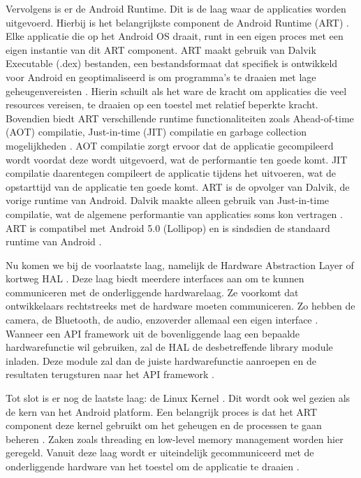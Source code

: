 Vervolgens is er de Android Runtime. Dit is de laag waar de applicaties worden uitgevoerd. Hierbij is het belangrijkste component de Android Runtime (ART) \autocite{Bron7}. Elke applicatie die op het Android OS draait, runt in een eigen proces met een eigen instantie van dit ART component. ART maakt gebruik van Dalvik Executable (.dex) bestanden, een bestandsformaat dat specifiek is ontwikkeld voor Android en geoptimaliseerd is om programma's te draaien met lage geheugenvereisten \autocite{Bron14}. Hierin schuilt als het ware de kracht om applicaties die veel resources vereisen, te draaien op een toestel met relatief beperkte kracht. Bovendien biedt ART verschillende runtime functionaliteiten zoals Ahead-of-time (AOT) compilatie, Just-in-time (JIT) compilatie en garbage collection mogelijkheden \autocite{Bron7, Bron14}. AOT compilatie zorgt ervoor dat de applicatie gecompileerd wordt voordat deze wordt uitgevoerd, wat de performantie ten goede komt. JIT compilatie daarentegen compileert de applicatie tijdens het uitvoeren, wat de opstarttijd van de applicatie ten goede komt. ART is de opvolger van Dalvik, de vorige runtime van Android. Dalvik maakte alleen gebruik van Just-in-time compilatie, wat de algemene performantie van applicaties soms kon vertragen \autocite{Bron13}. ART is compatibel met Android 5.0 (Lollipop) en is sindsdien de standaard runtime van Android \autocite{Bron7, Bron13}.

Nu komen we bij de voorlaatste laag, namelijk de Hardware Abstraction Layer of kortweg HAL \autocite{Bron7}. Deze laag biedt meerdere interfaces aan om te kunnen communiceren met de onderliggende hardwarelaag. Ze voorkomt dat ontwikkelaars rechtstreeks met de hardware moeten communiceren. Zo hebben de camera, de Bluetooth, de audio, enzoverder allemaal een eigen interface \autocite{Bron7}. Wanneer een API framework uit de bovenliggende laag een bepaalde hardwarefunctie wil gebruiken, zal de HAL de desbetreffende library module inladen. Deze module zal dan de juiste hardwarefunctie aanroepen en de resultaten terugsturen naar het API framework \autocite{Bron7}.

Tot slot is er nog de laatste laag: de Linux Kernel \autocite{Bron7, Bron13}. Dit wordt ook wel gezien als de kern van het Android platform. Een belangrijk proces is dat het ART component deze kernel gebruikt om het geheugen en de processen te gaan beheren \autocite{Bron7, Bron13}. Zaken zoals threading en low-level memory management worden hier geregeld. Vanuit deze laag wordt er uiteindelijk gecommuniceerd met de onderliggende hardware van het toestel om de applicatie te draaien \autocite{Bron13}.

